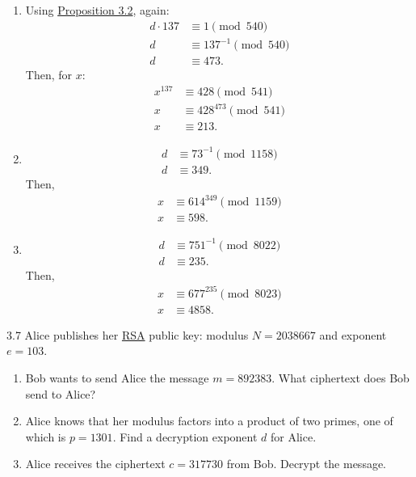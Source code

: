 {\begin{enumerate}
        \item Using \hyperlink{3.2}{Proposition 3.2}, again:
              \begin{align*}
                  d \cdot 137 & \equiv 1 \pmod{540}        \\
                  d           & \equiv 137^{-1} \pmod{540} \\
                  d           & \equiv 473.
              \end{align*} Then, for \(x\):
              \begin{align*}
                  x^{137} & \equiv 428 \pmod{541}       \\
                  x       & \equiv 428^{473} \pmod{541} \\
                  x       & \equiv 213.
              \end{align*}
        \item \begin{align*}
                  d & \equiv 73^{-1} \pmod{1158} \\
                  d & \equiv 349.
              \end{align*} Then,
              \begin{align*}
                  x & \equiv 614^{349} \pmod{1159} \\
                  x & \equiv 598. 
              \end{align*}
        \item \begin{align*}
                  d & \equiv 751^{-1} \pmod{8022} \\
                  d & \equiv 235.
              \end{align*} Then, \begin{align*}
                  x & \equiv 677^{235} \pmod{8023} \\
                  x & \equiv 4858. 
              \end{align*}
    \end{enumerate}
}

\begin{exercise}
    {3.7} {Alice publishes her \hyperlink{sec:RSA Algorithm}{RSA} public key: modulus \(N = 2038667\) and exponent \(e = 103\).}
    \begin{enumerate}
        \item Bob wants to send Alice the message \(m = 892383\). What ciphertext does Bob send to Alice?
        \item Alice knows that her modulus factors into a product of two primes, one of which is \(p = 1301\). Find a decryption exponent \(d\) for Alice.
        \item Alice receives the ciphertext \(c = 317730\) from Bob. Decrypt the message.
    \end{enumerate}
\end{exercise}

